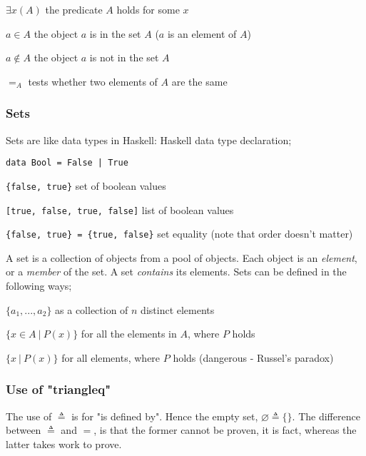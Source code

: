 \documentclass[a4paper, 12pt]{article}
\begin{document}
                $\exists x (A)$ \hfill the predicate $A$ holds for some $x$
                \smallskip

                $a \in A$ \hfill the object $a$ is in the set $A$ ($a$ is an element of $A$)
                \smallskip

                $a \notin A$ \hfill the object $a$ is not in the set $A$
                \smallskip

                $=_A$ \hfill tests whether two elements of $A$ are the same
            \subsubsection*{Sets}
                Sets are like data types in Haskell: Haskell data type declaration;
                \medskip

                \texttt{data Bool = False | True}
                \smallskip

                \texttt{\{false, true\}} \hfill set of boolean values
                \smallskip

                \texttt{[true, false, true, false]} \hfill list of boolean values
                \smallskip

                \texttt{\{false, true\} = \{true, false\}} \hfill set equality (note that order doesn't matter)
                \medskip

                A set is a collection of objects from a pool of objects. Each object is an \textit{element}, or a \textit{member} of the set. A set \textit{contains} its elements. Sets can be defined in the following ways;
                \medskip

                $\{a_1, ..., a_2\}$ \hfill as a collection of $n$ distinct elements
                \smallskip

                $\{x \in A\ |\ P(x)\}$ \hfill for all the elements in $A$, where $P$ holds
                \smallskip

                $\{x\ |\ P(x)\}$ \hfill for all elements, where $P$ holds (dangerous - Russel's paradox)
            \subsubsection*{Use of "triangleq"}
                The use of $\triangleq$ is for "is defined by". Hence the empty set, $\varnothing \triangleq \{\}$. The difference between $\triangleq$ and $=$, is that the former cannot be proven, it is fact, whereas the latter takes work to prove.
\end{document}
